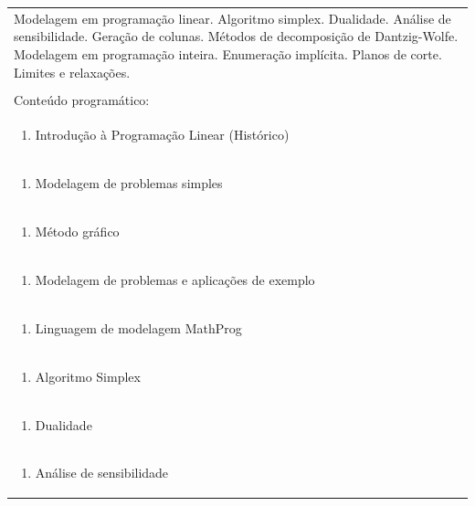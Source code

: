 \documentclass[11pt]{article}
\begin{document}
\begin{center}
\begin{longtable}{|p{4cm}|p{4cm}|p{4cm}|p{4cm}|}
\multicolumn{4}{|p{\dimexpr 16cm + 6\tabcolsep\relax}|}{Modelagem em programação linear. Algoritmo simplex. Dualidade. Análise de sensibilidade. Geração de colunas. Métodos de decomposição de Dantzig-Wolfe. Modelagem em programação inteira. Enumeração implícita. Planos de corte. Limites e relaxações.}\\
\multicolumn{4}{|p{16cm}|}{}\\
\hline
\multicolumn{4}{|p{16cm}|}{Conteúdo programático:}\\*
\multicolumn{4}{|p{\dimexpr 16cm + 6\tabcolsep\relax}|}{\begin{enumerate}[start=1]\item Introdução à Programação Linear (Histórico)\end{enumerate}}\\
\multicolumn{4}{|p{\dimexpr 16cm + 6\tabcolsep\relax}|}{\begin{enumerate}[start=2]\item Modelagem de problemas simples\end{enumerate}}\\
\multicolumn{4}{|p{\dimexpr 16cm + 6\tabcolsep\relax}|}{\begin{enumerate}[start=3]\item Método gráfico\end{enumerate}}\\
\multicolumn{4}{|p{\dimexpr 16cm + 6\tabcolsep\relax}|}{\begin{enumerate}[start=4]\item Modelagem de problemas e aplicações de exemplo\end{enumerate}}\\
\multicolumn{4}{|p{\dimexpr 16cm + 6\tabcolsep\relax}|}{\begin{enumerate}[start=5]\item Linguagem de modelagem MathProg\end{enumerate}}\\
\multicolumn{4}{|p{\dimexpr 16cm + 6\tabcolsep\relax}|}{\begin{enumerate}[start=6]\item Algoritmo Simplex\end{enumerate}}\\
\multicolumn{4}{|p{\dimexpr 16cm + 6\tabcolsep\relax}|}{\begin{enumerate}[start=7]\item Dualidade\end{enumerate}}\\
\multicolumn{4}{|p{\dimexpr 16cm + 6\tabcolsep\relax}|}{\begin{enumerate}[start=8]\item Análise de sensibilidade\end{enumerate}}\\

\end{longtable}
\end{center}
\end{document}
